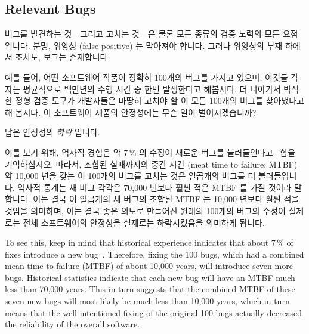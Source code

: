 \fi

\subsection{Relevant Bugs}
\label{sec:future:Relevant Bugs}

버그를 발견하는 것---그리고 고치는 것---은 물론 모든 종류의 검증 노력의 모든
요점입니다.
분명, 위양성 (false positive) 는 막아져야 합니다.
그러나 위양성의 부재 하에서 조차도, 보그는 존재합니다.

예를 들어, 어떤 소프트웨어 작품이 정확히 100개의 버그를 가지고 있으며, 이것들
각자는 평균적으로 백만년의 수행 시간 중 한번 발생한다고 해봅시다.
더 나아가서 박식한 정형 검증 도구가 개발자들은 마땅히 고쳐야 할 이 모든 100개의
버그를 찾아냈다고 해 봅시다.
이 소프트웨어 제품의 안정성에는 무슨 일이 벌어지겠습니까?

답은 안정성의 \emph{하락} 입니다.

\iffalse

Finding bugs---and fixing them---is of course the whole point of any
type of validation effort.
Clearly, false positives are to be avoided.
But even in the absence of false positives, there are bugs and there are bugs.

For example, suppose that a software artifact had exactly 100 remaining
bugs, each of which manifested on average once every million years
of runtime.
Suppose further that an omniscient formal-verification tool located
all 100 bugs, which the developers duly fixed.
What happens to the reliability of this software artifact?

The answer is that the reliability \emph{decreases}.

\fi

이를 보기 위해, 역사적 경험은 약 7\,\% 의 수정이 새로운 버그를
불러들인다고~\cite{RexBlack2012SQA} 함을 기억하십시오.
따라서, 조합된 실패까지의 중간 시간 (meat time to failure: MTBF) 약 10,000 년을
갖는 이 100개의 버그를 고치는 것은 일곱개의 버그를 더 불러들입니다.
역사적 통계는 새 버그 각각은 70,000 년보다 훨씬 적은 MTBF 를 가질 것이라
말합니다.
이는 결국 이 일곱개의 새 버그의 조합된 MTBF 는 10,000 년보다 훨씬 적을 것임을
의미하며, 이는 결국 좋은 의도로 만들어진 원래의 100개의 버그의 수정이 실제로는
전체 소프트웨어의 안정성을 실제로는 하락시켰음을 의미하게 됩니다.

\iffalse

To see this, keep in mind that historical experience indicates that
about 7\,\% of fixes introduce a new bug~\cite{RexBlack2012SQA}.
Therefore, fixing the 100 bugs, which had a combined mean time to failure
(MTBF) of about 10,000 years, will introduce seven more bugs.
Historical statistics indicate that each new bug will have an MTBF
much less than 70,000 years.
This in turn suggests that the combined MTBF of these seven new bugs
will most likely be much less than 10,000 years, which in turn means
that the well-intentioned fixing of the original 100 bugs actually
decreased the reliability of the overall software.

